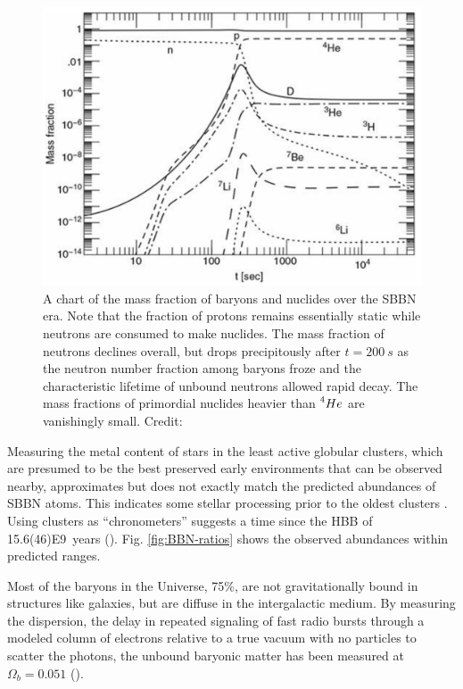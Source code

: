 \documentclass{paper}
\begin{document}
  \begin{figure}[H]
    \begin{centering}
    \includegraphics[scale=0.3]{BBN-frac.pdf}
    \caption{A chart of the mass fraction of baryons and nuclides over the
      SBBN era. Note that the fraction of protons remains essentially static
      while neutrons are consumed to make nuclides. The mass fraction of 
      neutrons declines overall, but drops precipitously after 
      \(t = \SI{200}{s}\) as the neutron number fraction among baryons froze 
      and the characteristic lifetime of unbound neutrons allowed rapid decay.
      The mass fractions of primordial nuclides heavier than 
      \(\prescript{4}{}{He}\) are vanishingly small.
    Credit: \cite{ryden2003introduction}}
    \label{fig:BBN-frac}
    \end{centering}
  \end{figure}

  Measuring the metal content of stars in the least active globular clusters, 
  which are presumed to be the best preserved early environments that can be 
  observed nearby, approximates but does not exactly match the predicted 
  abundances of SBBN atoms. This indicates some stellar processing prior to 
  the oldest clusters \cite{Kalirai_2010}. Using clusters as ``chronometers'' 
  suggests a time since the HBB of 
  \SI{15.6(46)E9}{years} (\cite{1999ApJ...521..194C}).
  Fig. \ref{fig:BBN-ratios} shows the observed abundances within predicted
  ranges.

  Most of the baryons in the Universe, 75\%, are not gravitationally bound in 
  structures like galaxies, but are diffuse in the intergalactic medium. By 
  measuring the dispersion, the delay in repeated signaling of fast radio 
  bursts through a modeled column of electrons relative to a true vacuum with 
  no particles to scatter the photons, the unbound baryonic matter has been 
  measured at \(\Omega_b = 0.051\) (\cite{2020Natur.581..391M}).
\end{document}
